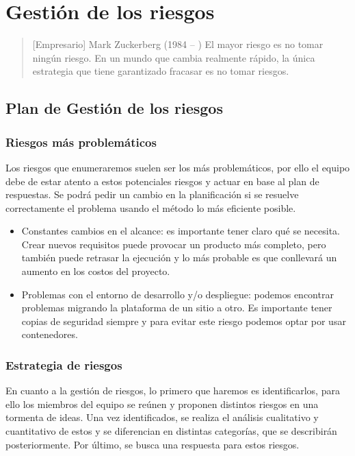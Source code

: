 \chapter{Gestión de los riesgos}

\begin{quotation} [Empresario] {Mark Zuckerberg (1984 -- )}
El mayor riesgo es no tomar ningún riesgo. En un mundo que cambia realmente rápido, la única estrategia que tiene garantizado fracasar es no tomar riesgos.
\end{quotation}

\begin{abstract}
Se tratará sobre los posibles riesgos de la aplicación así como las medidas que se realizarán para subsanar los mismos
\end{abstract}


\section{Plan de Gestión de los riesgos}
\subsection{Riesgos más problemáticos}
Los riesgos que enumeraremos suelen ser los más problemáticos, por ello el equipo debe de estar atento a estos potenciales riesgos y actuar en base al plan de respuestas. Se podrá pedir un cambio en la planificación si se resuelve correctamente el problema usando el método lo más eficiente posible.

\begin{itemize}
    \item Constantes cambios en el alcance: es importante tener claro qué se necesita. Crear nuevos requisitos puede provocar un producto más completo, pero también puede retrasar la ejecución y lo más probable es que conllevará un aumento en los costos del proyecto.
    \item Problemas con el entorno de desarrollo y/o despliegue: podemos encontrar problemas migrando la plataforma de un sitio a otro. Es importante tener copias de seguridad siempre y para evitar este riesgo podemos optar por usar contenedores.
\end{itemize}

\subsection{Estrategia de riesgos}
En cuanto a la gestión de riesgos, lo primero que haremos es identificarlos, para ello los miembros del equipo se reúnen y proponen distintos riesgos en una tormenta de ideas. Una vez identificados, se realiza el análisis cualitativo y cuantitativo de estos y se diferencian en distintas categorías, que se describirán posteriormente. Por último, se busca una respuesta para estos riesgos.

